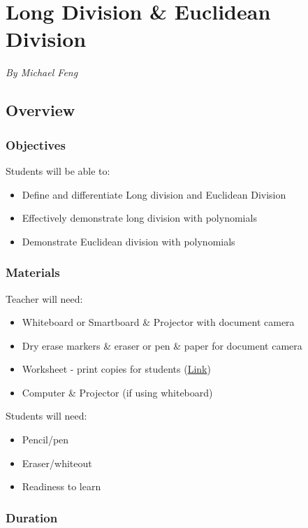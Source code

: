 \chapter{Long Division \& Euclidean Division}

\emph{By Michael Feng}

\section{Overview}

\subsection{Objectives}

Students will be able to:
\begin{itemize}
    \item Define and differentiate Long division and Euclidean Division
    \item Effectively demonstrate long division with polynomials
    \item Demonstrate Euclidean division with polynomials
\end{itemize}

\subsection{Materials}

Teacher will need:
\begin{itemize}
    \item Whiteboard or Smartboard \& Projector with document camera
    \item Dry erase markers \& eraser or pen \& paper for document camera
    \item Worksheet - print copies for students (\href{https://www.hunter.cuny.edu/dolciani/pdf_files/brushup-materials/dividing-polynomials-using-long-division.pdf}{Link})
    \item Computer \& Projector (if using whiteboard)
\end{itemize}

Students will need:
\begin{itemize}
    \item Pencil/pen
    \item Eraser/whiteout
    \item Readiness to learn
\end{itemize}

\subsection{Duration}

